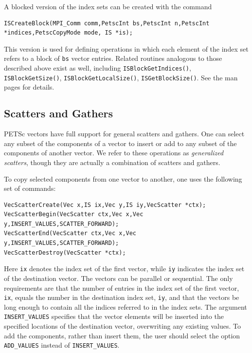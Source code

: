 A blocked version of the index sets can be created with the command
\begin{lstlisting}
ISCreateBlock(MPI_Comm comm,PetscInt bs,PetscInt n,PetscInt *indices,PetscCopyMode mode, IS *is);
\end{lstlisting}
This version is used for defining operations in which each element of the index
set refers to a block of \lstinline{bs} vector entries.  Related routines analogous
to those described above exist as well, including
\lstinline{ISBlockGetIndices()}, \lstinline{ISBlockGetSize()}, \lstinline{ISBlockGetLocalSize()}, \lstinline{ISGetBlockSize()}.
See the man pages for details.

\subsection{Scatters and Gathers}  
\label{sec_scatter}

PETSc vectors have full support for general scatters and
gathers. One can select any subset of the components of a vector to
insert or add to any subset of the components of another vector.
We refer to these operations as {\em generalized scatters}, though they are
actually a combination of scatters and gathers. 

 
To copy selected components from one vector
to another, one uses the following set of commands:
\begin{lstlisting}
VecScatterCreate(Vec x,IS ix,Vec y,IS iy,VecScatter *ctx);
VecScatterBegin(VecScatter ctx,Vec x,Vec y,INSERT_VALUES,SCATTER_FORWARD);
VecScatterEnd(VecScatter ctx,Vec x,Vec y,INSERT_VALUES,SCATTER_FORWARD);
VecScatterDestroy(VecScatter *ctx);
\end{lstlisting}
Here \lstinline{ix} denotes the index set of the first vector, while \lstinline{iy} 
indicates the index set of the destination vector.  The vectors
can be parallel or sequential. The only requirements are that the
number of entries in the index set of the first vector, \lstinline{ix},
equals the number in the destination index set, \lstinline{iy}, and that the
vectors be long enough to contain all the indices referred to in the
index sets.  The argument \lstinline{INSERT_VALUES} specifies that the
vector elements will be inserted into the specified locations of the
destination vector, overwriting any existing values.  To add the
components, rather than insert them, the user should select the option
\lstinline{ADD_VALUES} instead of \lstinline{INSERT_VALUES}.

